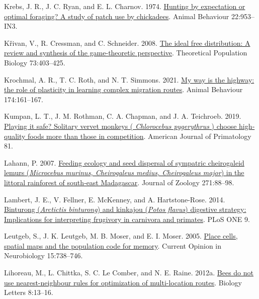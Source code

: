 \documentclass[twoside,12pt,final]{ucthesis-CA2012}
\newenvironment{CSLReferences}%
  {}%
  {\par}
\begin{document}
\begin{ucmainmatter}
\begin{CSLReferences}{1}{0}
\leavevmode{}%
Krebs, J. R., J. C. Ryan, and E. L. Charnov. 1974. \href{https://doi.org/10.1016/0003-3472(74)90018-9}{Hunting by expectation or optimal foraging? A study of patch use by chickadees}. Animal Behaviour 22:953--IN3.

\leavevmode{}%
Křivan, V., R. Cressman, and C. Schneider. 2008. \href{https://doi.org/10.1016/j.tpb.2007.12.009}{The ideal free distribution: A review and synthesis of the game-theoretic perspective}. Theoretical Population Biology 73:403--425.

\leavevmode{}%
Krochmal, A. R., T. C. Roth, and N. T. Simmons. 2021. \href{https://doi.org/10.1016/j.anbehav.2021.02.005}{My way is the highway: the role of plasticity in learning complex migration routes}. Animal Behaviour 174:161--167.

\leavevmode{}%
Kumpan, L. T., J. M. Rothman, C. A. Chapman, and J. A. Teichroeb. 2019. \href{https://doi.org/10.1002/ajp.23002}{Playing it safe? Solitary vervet monkeys ( \emph{Chlorocebus pygerythrus} ) choose high‐quality foods more than those in competition}. American Journal of Primatology 81.

\leavevmode{}%
Lahann, P. 2007. \href{https://doi.org/10.1111/j.1469-7998.2006.00222.x}{Feeding ecology and seed dispersal of sympatric cheirogaleid lemurs (\emph{Microcebus murinus, Cheirogaleus medius, Cheirogaleus major}) in the littoral rainforest of south‐east Madagascar}. Journal of Zoology 271:88--98.

\leavevmode{}%
Lambert, J. E., V. Fellner, E. McKenney, and A. Hartstone-Rose. 2014. \href{https://doi.org/10.1371/journal.pone.0105415}{Binturong (\emph{Arctictis binturong}) and kinkajou (\emph{Potos flavus}) digestive strategy: Implications for interpreting frugivory in carnivora and primates}. PLoS ONE 9.

\leavevmode{}%
Leutgeb, S., J. K. Leutgeb, M. B. Moser, and E. I. Moser. 2005. \href{https://doi.org/10.1016/j.conb.2005.10.002}{Place cells, spatial maps and the population code for memory}. Current Opinion in Neurobiology 15:738--746.

\leavevmode{}%
Lihoreau, M., L. Chittka, S. C. Le Comber, and N. E. Raine. 2012a. \href{https://doi.org/10.1098/rsbl.2011.0661}{Bees do not use nearest-neighbour rules for optimization of multi-location routes}. Biology Letters 8:13--16.


\end{CSLReferences}
\end{ucmainmatter}
\end{document}
